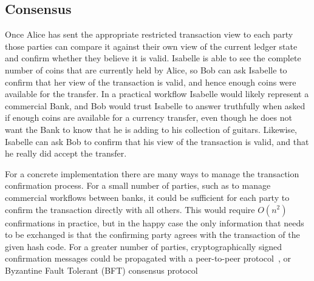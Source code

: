 \subsection{Consensus}
Once Alice has sent the appropriate restricted transaction view to each party those parties can compare it against their own view of the current ledger state and confirm whether they believe it is valid. Isabelle is able to see the complete number of coins that are currently held by Alice, so Bob can ask Isabelle to confirm that her view of the transaction is valid, and hence enough coins were available for the transfer. In a practical workflow Isabelle would likely represent a commercial Bank, and Bob would trust Isabelle to answer truthfully when asked if enough coins are available for a currency transfer, even though he does not want the Bank to know that he is adding to his collection of guitars. Likewise, Isabelle can ask Bob to confirm that his view of the transaction is valid, and that he really did accept the transfer.

For a concrete implementation there are many ways to manage the transaction confirmation process. For a small number of parties, such as to manage commercial workflows between banks, it could be sufficient for each party to confirm the transaction directly with all others. This would require $O(n^2)$ confirmations in practice, but in the happy case the only information that needs to be exchanged is that the confirming party agrees with the transaction of the given hash code. For a greater number of parties, cryptographically signed confirmation messages could be propagated with a peer-to-peer protocol~\cite{El-Ansary2003:Broadcast}, or Byzantine Fault Tolerant (BFT) consensus protocol~\cite{Lamport1982:Byzantine, Ongaro2014:Consensus, Gilad2017:Algorand}








